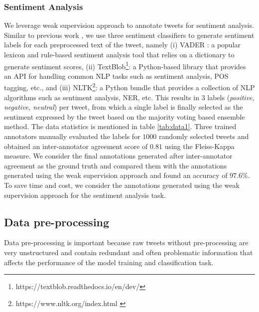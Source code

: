 \documentclass[letterpaper]{article}
\begin{document}
\subsubsection{Sentiment Analysis}
We leverage weak supervision approach to annotate tweets for sentiment analysis. Similar to previous work \cite{singh2021multitask}, we use three sentiment classifiers to generate sentiment labels for each preprocessed text of the tweet, namely (i) VADER \cite{hutto2014vader}: a popular lexicon and rule-based sentiment analysis tool that relies on a dictionary to generate sentiment scores, (ii) TextBlob\footnote{https://textblob.readthedocs.io/en/dev/}: a Python-based library that provides an API for handling common NLP tasks such as sentiment analysis, POS tagging, etc., and (iii) NLTK\footnote{
https://www.nltk.org/index.html \label{nltk}}: a Python bundle that provides a collection of NLP algorithms such as sentiment analysis, NER, etc. This results in $3$ labels (\textit{positive, negative, neutral}) per tweet, from which a single label is finally selected as the sentiment expressed by the tweet based on the majority voting based ensemble method. The data statistics is mentioned in table \ref{tab:data1}. Three trained annotators manually evaluated the labels for $1000$ randomly selected tweets and obtained an inter-annotator agreement score of $0.81$ using the Fleiss-Kappa measure. We consider the final annotations generated after inter-annotator agreement as the ground truth and compared them with the annotations generated using the weak supervision approach and found an accuracy of $97.6\%$. To save time and cost, we consider the annotations generated using the weak supervision approach for the sentiment analysis task.

\begin{table}
\centering
{}
 \setlength{\abovecaptionskip}{2pt}
  \setlength{\belowcaptionskip}{-5pt}
\caption{Data Statistics for Sentiment Task}
\label{tab:data1}
\end{table}

\subsection{Data pre-processing} \label{data_preprocess}
Data pre-processing is important because raw tweets without pre-processing are very unstructured and contain redundant and often problematic information that affects the performance of the model training and classification task.
\end{document}
